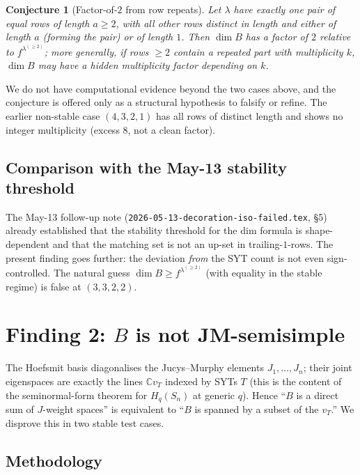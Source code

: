 \documentclass[11pt]{article}
\newtheorem{conjecture}[theorem]{Conjecture}
\theoremstyle{definition}
\begin{document}
\begin{conjecture}[Factor-of-$2$ from row repeats]\label{conj:row-repeat}
Let $\lambda$ have exactly one pair of equal rows of length $a \ge 2$,
with all other rows distinct in length and either of length $a$
(forming the pair) or of length $1$. Then $\dim B$ has a factor of $2$
relative to $f^{\lambda^{(\ge 2)}}$; more generally, if rows $\ge 2$
contain a repeated part with multiplicity $k$, $\dim B$ may have a
hidden multiplicity factor depending on $k$.
\end{conjecture}

We do not have computational evidence beyond the two cases above, and
the conjecture is offered only as a structural hypothesis to falsify or
refine. The earlier non-stable case $(4,3,2,1)$ has all rows of
distinct length and shows no integer multiplicity (excess $8$, not a
clean factor).

\subsection{Comparison with the May-13 stability threshold}

The May-13 follow-up note (\texttt{2026-05-13-decoration-iso-failed.tex},
\S 5) already established that the stability threshold for the dim
formula is shape-dependent and that the matching set is not an up-set
in trailing-$1$-rows. The present finding goes further: the deviation
\emph{from} the SYT count is not even sign-controlled. The natural
guess $\dim B \ge f^{\lambda^{(\ge 2)}}$ (with equality in the stable
regime) is false at $(3,3,2,2)$.

\section{Finding 2: $B$ is not JM-semisimple}\label{sec:jm}

The Hoefsmit basis diagonalises the Jucys--Murphy elements $J_1, \ldots,
J_n$; their joint eigenspaces are exactly the lines $\mathbb{C} v_T$
indexed by SYTs $T$ (this is the content of the seminormal-form theorem
for $H_q(S_n)$ at generic $q$). Hence ``$B$ is a direct sum of $J$-weight
spaces'' is equivalent to ``$B$ is spanned by a subset of the $v_T$.'' We
disprove this in two stable test cases.

\subsection{Methodology}\label{ssec:meth}
\end{document}
